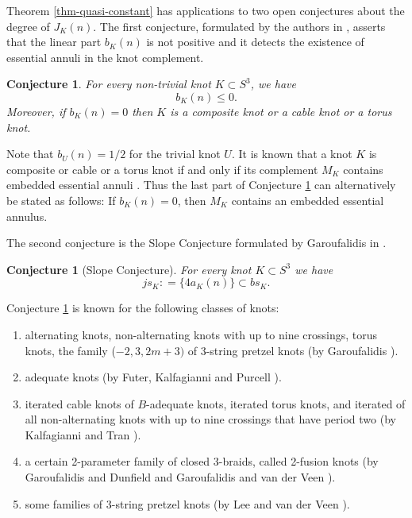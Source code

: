 \documentclass[11pt]{amsart}
\numberwithin{equation}{section}
\theoremstyle{plain}
\newtheorem{conjecture}[theorem]{Conjecture}
\theoremstyle{definition}
\begin{document}
Theorem \ref{thm-quasi-constant} has applications to two open conjectures about the degree of  $J_K(n)$.
The first conjecture, formulated by the authors in  \cite{Effie-Anh-slope},  asserts  that the linear part
$b_K(n)$ is not positive and it detects the existence of essential annuli in the knot complement.



\begin{conjecture} \cite{Effie-Anh-slope}
\label{conj}
For every non-trivial knot $K \subset S^3$, we have $$b_K(n) \le 0.$$
Moreover, if $b_K(n)=0$ then   $K$ is a composite knot or  a cable knot or a torus knot. 
\end{conjecture}

Note that $b_U(n)=1/2$ for the trivial knot $U$. 
 It is known that a knot $K$ is composite or cable or a torus knot if and only if its complement $M_K$ contains  embedded essential annuli \cite[Lemma V.1.3.4]{jacoshalen}. Thus the last part of Conjecture \ref{conj} can alternatively be stated as
follows: If $b_K(n)=0$, then $M_K$ contains an embedded essential  annulus.

The second conjecture is the Slope Conjecture formulated by Garoufalidis in  \cite{Ga-slope}.

\begin{conjecture} [Slope Conjecture] \cite{Ga-slope}
\label{slope}
For every knot $K \subset S^3$ we have 
$$js_K : = \{4a_K(n)\} \subset bs_K.$$
\end{conjecture}

Conjecture  \ref{slope} is known for the following classes of knots:
\begin{enumerate}

\item alternating knots, non-alternating knots with up to nine crossings, torus knots, the family ($-2, 3, 2m+3)$ of 3-string pretzel  knots (by Garoufalidis \cite{Ga-slope}).

\item adequate knots (by Futer, Kalfagianni and Purcell \cite{FKP}).



\item iterated cable knots of $B$-adequate knots,  iterated torus knots, and iterated of all non-alternating knots with up to nine crossings that have period two  (by Kalfagianni and Tran \cite{Effie-Anh-slope}).

\item a certain 2-parameter family of closed 3-braids, called 2-fusion knots (by Garoufalidis and Dunfield \cite{DG} and Garoufalidis and van der Veen \cite{GV}).



\item some families of 3-string pretzel knots (by Lee and van der Veen \cite{leV}).
\end{enumerate}
\end{document}
